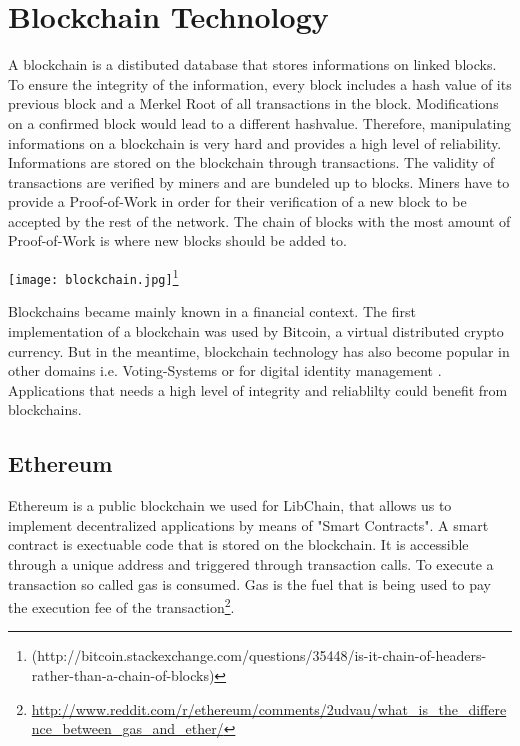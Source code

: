 \chapter{Blockchain Technology\label{cha:chapter1}}

A blockchain is a distibuted database that stores informations on linked blocks. To ensure the integrity of the information, every block includes a hash value of its previous block and a Merkel Root of all transactions in the block. Modifications on a confirmed block would lead to a different hashvalue. Therefore, manipulating informations on a blockchain is very hard and provides a high level of reliability.
Informations are stored on the blockchain through transactions. The validity of transactions are verified by miners and are bundeled up to blocks. Miners have to provide a Proof-of-Work in order for their verification of a new block to be accepted by the rest of the network. The chain of blocks with the most amount of Proof-of-Work is where new blocks should be added to. 

\vspace{0.3cm}
\texttt{[image: blockchain.jpg]}\footnote{(http://bitcoin.stackexchange.com/questions/35448/is-it-chain-of-headers-rather-than-a-chain-of-blocks)}

Blockchains became mainly known in a financial context. The first implementation of a blockchain was used by Bitcoin, a virtual distributed crypto currency.
But in the meantime, blockchain technology has also become popular in other domains i.e. Voting-Systems \cite{yermack2017corporate} or for digital identity management \cite{isaen}. Applications that needs a high level of integrity and reliablilty could benefit from blockchains.




\section{Ethereum}
Ethereum is a public blockchain we used for LibChain, that allows us to implement decentralized applications by means of "Smart Contracts". A smart contract is exectuable code that is stored on the blockchain. It is accessible through a unique address and triggered through transaction calls.
To execute a transaction so called gas is consumed. Gas is the fuel that is being used to pay the execution fee of the transaction\footnote{\url{http://www.reddit.com/r/ethereum/comments/2udvau/what_is_the_difference_between_gas_and_ether/}}.

